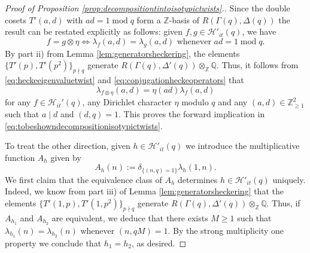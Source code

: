 \documentclass{article}
\theoremstyle{named}
\newcommand{\HH}{\mathcal{H}}
\newcommand{\Z}{\mathbb{Z}}
\newcommand{\Q}{\mathbb{Q}}
\DeclareMathOperator{\modulo}{mod}
\begin{document}
\begin{proof}[Proof of Proposition \ref{prop:decompositiontintoisotypictwists}.]
Since the double cosets $T'(a, d)$ with $ad = 1 \modulo q$ form a $\Z$-basis of $R(\Gamma(q), \Delta(q))$ the result can be restated explicitly as follows: given $f, g \in \HH'_{it}(q)$, we have 
\begin{equation}\label{eq:tobeshowndecompositionisotypictwists}
     f = g \otimes \eta \iff \lambda_f(a, d) = \lambda_g(a, d) \text{ whenever }ad = 1 \modulo q.
\end{equation} 
By part ii) from Lemma \ref{lem:generatorsheckering}, the elements $\{T'(p), T'(p^2)\}_{p \nmid q}$ generate $R(\Gamma(q), \Delta'(q)) \otimes_\Z \Q$. Thus, it follows from \eqref{eq:heckeeigenvaluetwist} and \eqref{eq:conjugationheckeoperators} that 
\begin{equation}\label{eq:twistinggeneralheckeeigenvalues}
\lambda_{f \otimes \eta}(a, d) = \eta(ad)\lambda_{f}(a, d)
\end{equation}
for any $f \in \HH_{it}'(q)$, any Dirichlet character $\eta$ modulo $q$ and any $(a, d) \in \Z^2_{\geq 1}$ such that $a\mid d$ and $(d, q) = 1$. This proves the forward implication in \eqref{eq:tobeshowndecompositionisotypictwists}.  %

To treat the other direction, given $h \in \HH'_{it}(q)$ we introduce the multiplicative function $A_h$ given by 
\begin{equation*}
    A_h(n):= \delta_{\{(n, q) = 1\}}\lambda_h(1, n).
\end{equation*}
We first claim that the equivalence class of $A_h$ determines $h \in \HH'_{it}(q)$ uniquely. Indeed, we know from part iii) of Lemma \ref{lem:generatorsheckering} that the elements $\{T'(1, p), T'(1, p^2)\}_{p \nmid q}$ generate $R(\Gamma(q), \Delta'(q)) \otimes_\Z \Q$. Thus, if $A_{h_1}$ and $A_{h_2}$ are equivalent, we deduce that there exists $M\geq 1$ such that $\lambda_{h_1}(n) = \lambda_{h_2}(n)$ whenever $(n, qM) = 1$. By the strong multiplicity one property we conclude that $h_1 = h_2$, as desired.


\end{proof}
\end{document}
